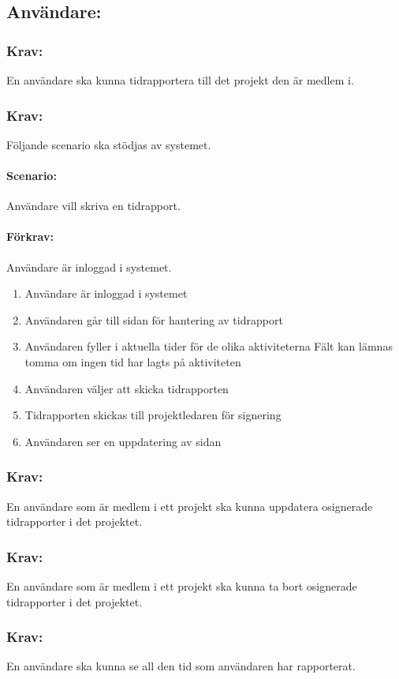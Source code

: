 \documentclass[paper=a4, fontsize=11pt,twoside]{article}
\begin{document}
	\subsection{Användare:}
	\subsubsection{Krav:} En användare ska kunna tidrapportera till det projekt den är medlem i.
	\subsubsection{Krav:} Följande scenario ska stödjas av systemet.
	\paragraph{Scenario:} Användare vill skriva en tidrapport.
	\paragraph{Förkrav:}
	Användare är inloggad i systemet.
	
	\begin{enumerate}
		\item	Användare är inloggad i systemet
		\item 	Användaren går till sidan för hantering av tidrapport
		\item 	Användaren fyller i aktuella tider för de olika aktiviteterna Fält kan lämnas tomma om ingen tid har lagts på aktiviteten
		\item	Användaren väljer att skicka tidrapporten
		\item 	Tidrapporten skickas till projektledaren för signering
		\item Användaren ser en uppdatering av sidan
		
		
	\end{enumerate}
	
	\subsubsection{Krav:} En användare som är medlem i ett projekt ska kunna uppdatera osignerade tidrapporter i det projektet.
	\subsubsection{Krav:} En användare som är medlem i ett projekt ska kunna ta bort osignerade tidrapporter i det projektet.
	\subsubsection{Krav:}En användare ska kunna se all den tid som användaren har rapporterat.
\end{document}
